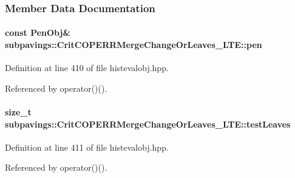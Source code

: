 \subsubsection{\-Member \-Data \-Documentation}
\hypertarget{classsubpavings_1_1CritCOPERRMergeChangeOrLeaves__LTE_aff23c038312142d8ff98afbadee5c1c0}{
\paragraph[{pen}]{\setlength{\rightskip}{0pt plus 5cm}const {\bf \-Pen\-Obj}\& {\bf subpavings\-::\-Crit\-C\-O\-P\-E\-R\-R\-Merge\-Change\-Or\-Leaves\-\_\-\-L\-T\-E\-::pen}}}\label{classsubpavings_1_1CritCOPERRMergeChangeOrLeaves__LTE_aff23c038312142d8ff98afbadee5c1c0}


\-Definition at line 410 of file histevalobj.\-hpp.



\-Referenced by operator()().

\hypertarget{classsubpavings_1_1CritCOPERRMergeChangeOrLeaves__LTE_a7890e344b86bc0b15a8becd7922d0bb9}{
\paragraph[{test\-Leaves}]{\setlength{\rightskip}{0pt plus 5cm}size\-\_\-t {\bf subpavings\-::\-Crit\-C\-O\-P\-E\-R\-R\-Merge\-Change\-Or\-Leaves\-\_\-\-L\-T\-E\-::test\-Leaves}}}\label{classsubpavings_1_1CritCOPERRMergeChangeOrLeaves__LTE_a7890e344b86bc0b15a8becd7922d0bb9}


\-Definition at line 411 of file histevalobj.\-hpp.



\-Referenced by operator()().

